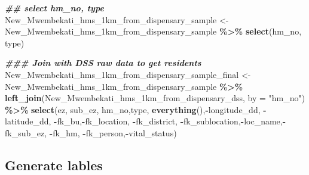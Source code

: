 \documentclass[
]{article}
\newenvironment{Shaded}{\begin{snugshade}}{\end{snugshade}}
\newcommand{\AttributeTok}[1]{\textcolor[rgb]{0.13,0.29,0.53}{#1}}
\newcommand{\DocumentationTok}[1]{\textcolor[rgb]{0.56,0.35,0.01}{\textbf{\textit{#1}}}}
\newcommand{\FunctionTok}[1]{\textcolor[rgb]{0.13,0.29,0.53}{\textbf{#1}}}
\newcommand{\NormalTok}[1]{#1}
\newcommand{\OtherTok}[1]{\textcolor[rgb]{0.56,0.35,0.01}{#1}}
\newcommand{\SpecialCharTok}[1]{\textcolor[rgb]{0.81,0.36,0.00}{\textbf{#1}}}
\newcommand{\StringTok}[1]{\textcolor[rgb]{0.31,0.60,0.02}{#1}}
\begin{document}
\begin{Shaded}
\begin{Highlighting}[]
\DocumentationTok{\#\# select hm\_no, type}
\NormalTok{New\_Mwembekati\_hms\_1km\_from\_dispensary\_sample }\OtherTok{\textless{}{-}}\NormalTok{ New\_Mwembekati\_hms\_1km\_from\_dispensary\_sample }\SpecialCharTok{\%\textgreater{}\%} 
  \FunctionTok{select}\NormalTok{(hm\_no, type)}

\DocumentationTok{\#\#\# Join with DSS raw data to get residents }
\NormalTok{New\_Mwembekati\_hms\_1km\_from\_dispensary\_sample\_final }\OtherTok{\textless{}{-}}\NormalTok{ New\_Mwembekati\_hms\_1km\_from\_dispensary\_sample }\SpecialCharTok{\%\textgreater{}\%} 
  \FunctionTok{left\_join}\NormalTok{(New\_Mwembekati\_hms\_1km\_from\_dispensary\_dss, }\AttributeTok{by =} \StringTok{"hm\_no"}\NormalTok{) }\SpecialCharTok{\%\textgreater{}\%} 
  \FunctionTok{select}\NormalTok{(ez, sub\_ez, hm\_no,type, }\FunctionTok{everything}\NormalTok{(),}\SpecialCharTok{{-}}\NormalTok{longitude\_dd, }\SpecialCharTok{{-}}\NormalTok{latitude\_dd, }\SpecialCharTok{{-}}\NormalTok{fk\_bu,}\SpecialCharTok{{-}}\NormalTok{fk\_location, }\SpecialCharTok{{-}}\NormalTok{fk\_district, }\SpecialCharTok{{-}}\NormalTok{fk\_sublocation,}\SpecialCharTok{{-}}\NormalTok{loc\_name,}\SpecialCharTok{{-}}\NormalTok{fk\_sub\_ez, }\SpecialCharTok{{-}}\NormalTok{fk\_hm, }\SpecialCharTok{{-}}\NormalTok{fk\_person,}\SpecialCharTok{{-}}\NormalTok{vital\_status)}
\end{Highlighting}
\end{Shaded}

\subsection{Generate lables}\label{generate-lables}
\end{document}
